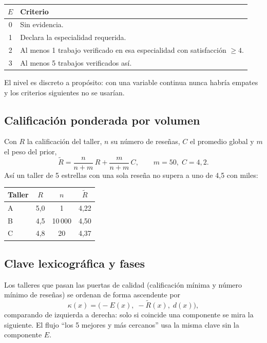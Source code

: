 \documentclass[11pt,a4paper]{article}
\begin{document}
\begin{center}
\begin{tabularx}{0.9\textwidth}{@{}c Y@{}}
\toprule
$E$ & Criterio \\
 & Sin evidencia. \\
1 & Declara la especialidad requerida. \\
2 & Al menos 1 trabajo verificado en esa especialidad con satisfacción $\ge 4$. \\
3 & Al menos 5 trabajos verificados así. \\
\bottomrule
\end{tabularx}
\end{center}

El nivel es discreto a propósito: con una variable continua nunca habría empates y los criterios siguientes no se usarían.

\subsection{Calificación ponderada por volumen}

Con $R$ la calificación del taller, $n$ su número de reseñas, $C$ el promedio global y $m$ el peso del prior,
\begin{equation}
\tilde{R} = \frac{n}{n+m}\,R + \frac{m}{n+m}\,C,
\qquad m = 50,\; C = 4{,}2 .
\end{equation}
Así un taller de 5 estrellas con una sola reseña no supera a uno de 4,5 con miles:

\begin{center}
\begin{tabular}{@{}l c c c@{}}
\toprule
Taller & $R$ & $n$ & $\tilde{R}$ \\
\midrule
A & 5,0 & 1      & 4,22 \\
B & 4,5 & 10\,000 & 4,50 \\
C & 4,8 & 20     & 4,37 \\
\bottomrule
\end{tabular}
\end{center}

\subsection{Clave lexicográfica y fases}

Los talleres que pasan las puertas de calidad (calificación mínima y número mínimo de reseñas) se
ordenan de forma ascendente por
\begin{equation}
\kappa(x) = \bigl(-E(x),\; -\tilde{R}(x),\; d(x)\bigr),
\end{equation}
comparando de izquierda a derecha: solo si coincide una componente se mira la siguiente. El flujo
``los 5 mejores y más cercanos'' usa la misma clave sin la componente $E$.
\end{document}

